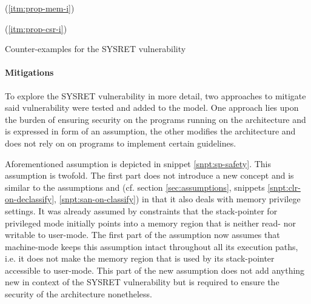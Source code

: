 \begin{table}
    \begin{subtable}{\textwidth}
        \centering
        
        \caption{ (\ref{itm:prop-mem-i})}
    \end{subtable}

    \begin{subtable}{\textwidth}
        \centering
        
        \caption{ (\ref{itm:prop-csr-i})}
    \end{subtable}
    \caption{Counter-examples for the SYSRET vulnerability}
    \label{tbl:cex-sysret}
\end{table}

\paragraph{Mitigations}

To explore the SYSRET vulnerability in more detail, two approaches to mitigate said vulnerability were tested and added to the model.
One approach lies upon the burden of ensuring security on the programs running on the architecture and is expressed in form of an assumption, the other modifies the architecture and does not rely on on programs to implement certain guidelines.

Aforementioned assumption is depicted in snippet \ref{snpt:sp-safety}.
This assumption is twofold.
The first part does not introduce a new concept and is similar to the assumptions  and  (cf. section \ref{sec:assumptions}, snippets \ref{snpt:clr-on-declassify}, \ref{snpt:san-on-classify}) in that it also deals with memory privilege settings.
It was already assumed by  constraints that the stack-pointer for privileged mode initially points into a memory region that is neither read- nor writable to user-mode.
The first part of the assumption  now assumes that machine-mode keeps this assumption intact throughout all its execution paths, i.e. it does not make the memory region that is used by its stack-pointer accessible to user-mode.
This part of the new assumption does not add anything new in context of the SYSRET vulnerability but is required to ensure the security of the architecture nonetheless.

